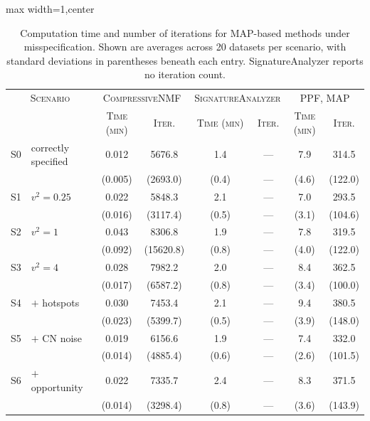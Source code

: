 \begin{table}[th]
\caption{Computation time and number of iterations for MAP-based methods under misspecification. Shown are averages across 20 datasets per scenario, with standard deviations in parentheses beneath each entry. SignatureAnalyzer reports no iteration count.}
\centering
\footnotesize
\begin{adjustbox}{max width=1\textwidth,center}
\begin{tabular}{|cl|cc|cc|cc|}
\hline
\multicolumn{2}{|c|}{\textsc{Scenario}} & \multicolumn{2}{c|}{\textsc{CompressiveNMF}} & \multicolumn{2}{c|}{\textsc{SignatureAnalyzer}} & \multicolumn{2}{c|}{\textsc{PPF, MAP}} \\
& & \textsc{Time (min)} & \textsc{Iter.} & \textsc{Time (min)} & \textsc{Iter.} & \textsc{Time (min)} & \textsc{Iter.} \\
\hline
S0 & correctly specified & 0.012 & 5676.8 & 1.4 & --- & 7.9 & 314.5 \\
 & & {\scriptsize (0.005)} & {\scriptsize (2693.0)} & {\scriptsize (0.4)} & --- & {\scriptsize (4.6)} & {\scriptsize (122.0)} \\
\hline
S1 & $v^2 = 0.25$ & 0.022 & 5848.3 & 2.1 & --- & 7.0 & 293.5 \\
 & & {\scriptsize (0.016)} & {\scriptsize (3117.4)} & {\scriptsize (0.5)} & --- & {\scriptsize (3.1)} & {\scriptsize (104.6)} \\
\hline
S2 & $v^2 = 1$ & 0.043 & 8306.8 & 1.9 & --- & 7.8 & 319.5 \\
 & & {\scriptsize (0.092)} & {\scriptsize (15620.8)} & {\scriptsize (0.8)} & --- & {\scriptsize (4.0)} & {\scriptsize (122.0)} \\
\hline
S3 & $v^2 = 4$ & 0.028 & 7982.2 & 2.0 & --- & 8.4 & 362.5 \\
 & & {\scriptsize (0.017)} & {\scriptsize (6587.2)} & {\scriptsize (0.8)} & --- & {\scriptsize (3.4)} & {\scriptsize (100.0)} \\
\hline
S4 & $+$ hotspots & 0.030 & 7453.4 & 2.1 & --- & 9.4 & 380.5 \\
 & & {\scriptsize (0.023)} & {\scriptsize (5399.7)} & {\scriptsize (0.5)} & --- & {\scriptsize (3.9)} & {\scriptsize (148.0)} \\
\hline
S5 & $+$ CN noise & 0.019 & 6156.6 & 1.9 & --- & 7.4 & 332.0 \\
 & & {\scriptsize (0.014)} & {\scriptsize (4885.4)} & {\scriptsize (0.6)} & --- & {\scriptsize (2.6)} & {\scriptsize (101.5)} \\
\hline
S6 & $+$ opportunity & 0.022 & 7335.7 & 2.4 & --- & 8.3 & 371.5 \\
 & & {\scriptsize (0.014)} & {\scriptsize (3298.4)} & {\scriptsize (0.8)} & --- & {\scriptsize (3.6)} & {\scriptsize (143.9)} \\
\hline
\end{tabular}
\end{adjustbox}
\label{tab:sim_time_misspec}
\end{table}
